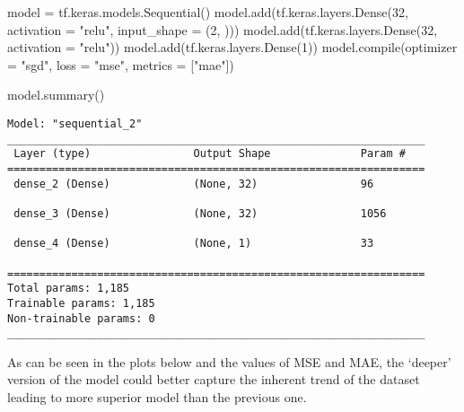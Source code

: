 \documentclass[
  letterpaper,
  DIV=11,
  numbers=noendperiod]{scrreprt}
\newenvironment{Shaded}{\begin{snugshade}}{\end{snugshade}}
\newcommand{\BuiltInTok}[1]{\textcolor[rgb]{0.00,0.23,0.31}{#1}}
\newcommand{\DecValTok}[1]{\textcolor[rgb]{0.68,0.00,0.00}{#1}}
\newcommand{\NormalTok}[1]{\textcolor[rgb]{0.00,0.23,0.31}{#1}}
\newcommand{\OperatorTok}[1]{\textcolor[rgb]{0.37,0.37,0.37}{#1}}
\newcommand{\StringTok}[1]{\textcolor[rgb]{0.13,0.47,0.30}{#1}}
\begin{document}
\begin{Shaded}
\begin{Highlighting}[]
\NormalTok{model }\OperatorTok{=}\NormalTok{ tf.keras.models.Sequential()}
\NormalTok{model.add(tf.keras.layers.Dense(}\DecValTok{32}\NormalTok{, activation }\OperatorTok{=} \StringTok{"relu"}\NormalTok{, input\_shape }\OperatorTok{=}\NormalTok{ (}\DecValTok{2}\NormalTok{, )))}
\NormalTok{model.add(tf.keras.layers.Dense(}\DecValTok{32}\NormalTok{, activation }\OperatorTok{=} \StringTok{"relu"}\NormalTok{))}
\NormalTok{model.add(tf.keras.layers.Dense(}\DecValTok{1}\NormalTok{))}
\NormalTok{model.}\BuiltInTok{compile}\NormalTok{(optimizer }\OperatorTok{=} \StringTok{"sgd"}\NormalTok{, loss }\OperatorTok{=} \StringTok{"mse"}\NormalTok{, metrics }\OperatorTok{=}\NormalTok{ [}\StringTok{"mae"}\NormalTok{])}

\NormalTok{model.summary()}
\end{Highlighting}
\end{Shaded}

\begin{verbatim}
Model: "sequential_2"
_________________________________________________________________
 Layer (type)                Output Shape              Param #   
=================================================================
 dense_2 (Dense)             (None, 32)                96        
                                                                 
 dense_3 (Dense)             (None, 32)                1056      
                                                                 
 dense_4 (Dense)             (None, 1)                 33        
                                                                 
=================================================================
Total params: 1,185
Trainable params: 1,185
Non-trainable params: 0
_________________________________________________________________
\end{verbatim}

As can be seen in the plots below and the values of MSE and MAE, the
`deeper' version of the model could better capture the inherent trend of
the dataset leading to more superior model than the previous one.
\end{document}
